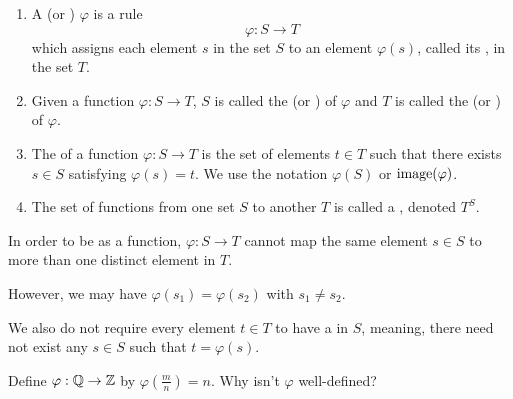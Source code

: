 \documentclass[../algebraNotesMSRI-UP2016.tex]{subfiles}
\begin{document}
\begin{frame}
\begin{dfn}
\begin{enumerate}
\item A  (or ) $\varphi$ is a rule
\[
\varphi:S\to T
\] 
which assigns each element $s$ in the set $S$ to an element $\varphi(s)$, called its , in the set $T$.  
\item Given a function $\varphi:S\to T$, $S$ is called the  (or ) of $\varphi$ and $T$ is called the  (or ) of $\varphi$.  
\item The  of a function $\varphi:S\to T$ is the set of elements $t\in T$ such that there exists $s\in S$ satisfying $\varphi(s)=t$.  We use the notation $\varphi(S)$ or $\operatorname{image}(\varphi)$.
\item The set of functions from one set $S$ to another $T$ is called a , denoted $T^S$.
\end{enumerate}
\end{dfn}
\end{frame}

\begin{frame}[c]{}{}
In order to be  as a function, $\varphi:S\to T$ cannot map the same element $s\in S$ to more than one distinct element in $T$.  

\smallGap
However, we may have $\varphi(s_1)=\varphi(s_2)$ with $s_1\neq s_2$.  

\smallGap
We also do not require every element $t\in T$ to have a  in $S$, meaning, there need not exist any $s\in S$ such that $t=\varphi(s)$.

\smallGap
\begin{ex}
Define $\varphi: \mathbb Q\to \mathbb Z$ by $\varphi(\frac{m}{n})=n$.  Why isn't $\varphi$ well-defined?
\end{ex}
\end{frame}
\end{document}
